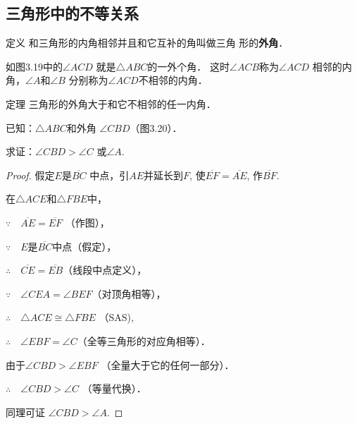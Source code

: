\subsection{三角形中的不等关系}
\begin{blk}{定义}
    和三角形的内角相邻并且和它互补的角叫做三角
形的\textbf{外角}．
\end{blk}
 
如图3.19中的$\angle ACD$
就是$\triangle ABC$的一外个角．
这时$\angle ACB$称为$\angle ACD$
相邻的内角，$\angle A$和$\angle B$
分别称为$\angle ACD$不相邻的内角．

\begin{blk}{定理}
 三角形的外角大于和它不相邻的任一内角．
\end{blk}

\begin{figure}[htp]\centering
    \begin{minipage}[t]{0.48\textwidth}
    \centering
{}
    \caption{}
    \end{minipage}
    \begin{minipage}[t]{0.48\textwidth}
    \centering
    \caption{}
    \end{minipage}
    \end{figure}

已知：$\triangle ABC$和外角
$\angle CBD$（图3.20）．

求证：$\angle CBD>\angle C$
或$\angle A$.

\begin{proof}
    假定$E$是$\overline{BC}$
中点，引$AE$并延长到$F$, 
使$\overline{EF}=\overline{AE}$, 作$\overline{BF}$.

在$\triangle ACE$和$\triangle FBE$中，

$\because\quad \overline{AE}=\overline{EF}$ （作图），

$\because\quad E$是$\overline{BC}$中点（假定），

$\therefore\quad \overline{CE}=\overline{EB}$（线段中点定义），

$\because\quad \angle CEA=\angle BEF$（对顶角相等），

$\therefore\quad \triangle ACE\cong \triangle FBE$ （SAS),

$\therefore\quad \angle EBF=\angle C$（全等三角形的对应角相等）．

由于$\angle CBD>\angle EBF$ （全量大于它的任何一部分）．

$\therefore\quad \angle CBD>\angle C$ （等量代换）．

同理可证 $\angle CBD> \angle A$.
\end{proof}

